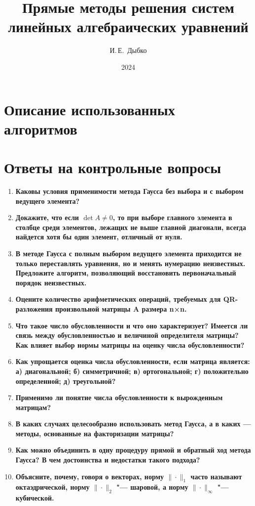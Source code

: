 \documentclass[12pt, a4paper]{article}
\title{Прямые методы решения систем
	линейных алгебраических уравнений}
\author{И.\,Е.~Дыбко}
\date{2024}
\begin{document}
	
	\maketitle
	
	\tableofcontents
	\section{Описание использованных алгоритмов}
	\section{Ответы на контрольные вопросы}
	\begin{enumerate}
	\item \textbf{Каковы условия применимости метода Гаусса без выбора
	и с выбором ведущего элемента?}
	\item \textbf{Докажите, что если $\det A \ne 0$, то при выборе главного
	элемента в столбце среди элементов, лежащих не выше
	главной диагонали, всегда найдется хотя бы один элемент,
	отличный от нуля.}
	\item \textbf{В методе Гаусса с полным выбором ведущего элемента приходится не только переставлять уравнения, но и менять нумерацию неизвестных. Предложите алгоритм, позволяющий восстановить первоначальный порядок неизвестных.}
	\item \textbf{Оцените количество арифметических операций, требуемых
	для QR-разложения произвольной матрицы A размера n×n.}
	\item \textbf{Что такое число обусловленности и что оно характеризует?
	Имеется ли связь между обусловленностью и величиной
	определителя матрицы? Как влияет выбор нормы матрицы
	на оценку числа обусловленности?}
	
	\item  \textbf{Как упрощается оценка числа обусловленности, если матрица является:
	а) диагональной;
	б) симметричной;
	в) ортогональной;
	г) положительно определенной;
	д) треугольной?}
	
	\item \textbf{Применимо ли понятие числа обусловленности к вырожденным матрицам?}
	
	\item \textbf{В каких случаях целесообразно использовать метод Гаусса,
	а в каких — методы, основанные на факторизации матрицы?}
	
	\item \textbf{Как можно объединить в одну процедуру прямой и обратный ход метода Гаусса? В чем достоинства и недостатки такого подхода?}
	\item \textbf{Объясните, почему, говоря о векторах, норму $\| \cdot \|_1$ часто
	называют октаэдрической, норму  $\| \cdot \|_2$ "--- шаровой, а норму
	 $\| \cdot \|_{\infty}$ "--- кубической.}
	\end{enumerate}
\end{document}
